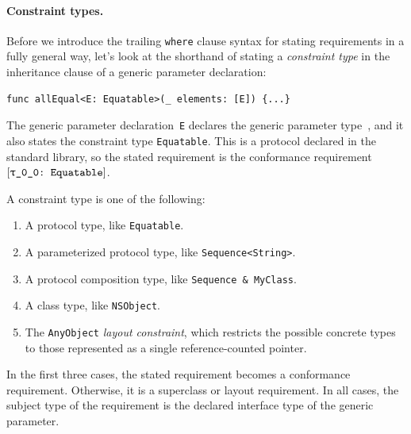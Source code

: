 \documentclass[../generics]{subfiles}
\begin{document}
\paragraph{Constraint types.}
Before we introduce the trailing \texttt{where} clause syntax for stating requirements in a fully general way, let's look at the shorthand of stating a \emph{constraint type} in the inheritance clause of a generic parameter declaration:
\begin{Verbatim}
func allEqual<E: Equatable>(_ elements: [E]) {...}
\end{Verbatim}
The generic parameter declaration~\texttt{E} declares the generic parameter type~\rT, and it also states the constraint type \texttt{Equatable}. This is a protocol declared in the standard library, so the stated requirement is the conformance requirement $\ConfReq{\rT}{Equatable}$.

\begin{definition}\label{def:constraint type}
A constraint type is one of the following:
\begin{enumerate}
\item A protocol type, like \texttt{Equatable}.
\item A parameterized protocol type, like \texttt{Sequence<String>}.
\item A protocol composition type, like \texttt{Sequence \& MyClass}.
\item A class type, like \texttt{NSObject}.
\item The \texttt{AnyObject} \emph{layout constraint}, which restricts the possible concrete types to those represented as a single reference-counted pointer.
\end{enumerate}
In the first three cases, the stated requirement becomes a conformance requirement. Otherwise, it is a superclass or layout requirement. In all cases, the subject type of the requirement is the declared interface type of the generic parameter.
\end{definition}
\end{document}
